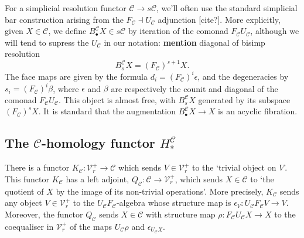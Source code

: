 \documentclass[11pt]{amsart}
\theoremstyle{plain}
\theoremstyle{definition}
\renewcommand{\to}{\longrightarrow}
\newcommand{\calC}{\mathcal{C}}
\newcommand{\calV}{\mathcal{V}}
\theoremstyle{plain}
\newcommand{\vect}[2]{\calV^{#1}_{#2}}
\begin{document}
\begin{Conventions and notation}
For a simplicial resolution functor $\calC\to s\calC$, we'll often use the standard simplicial bar construction arising from the $F_\calC\dashv U_\calC$ adjunction [cite?]. More explicitly, given $X\in\calC$, we define $B_\bullet^\calC X\in s\calC$ by iteration of the comonad $F_\calC U_\calC$, although we will tend to supress the $U_\calC$ in our notation: \textbf{mention} diagonal of bisimp resolution
\[B_s^\calC X=(F_\calC)^{s+1}X.\]
The face maps are given by the formula $d_i=(F_\calC)^i\epsilon$, and the degeneracies by $s_i=(F_\calC)^i\beta$, where $\epsilon$ and $\beta$ are respectively the counit and diagonal of the comonad $F_\calC U_\calC$. This object is almost free, with $B_s^\calC X$ generated by its subspace $(F_{\calC})^sX$. It is standard that the augmentation $B_\bullet^\calC X\to X$ is an acyclic fibration.


\subsection{The $\calC$-homology functor $H^{\calC}_*$}
There is a functor $K_\calC:\vect{+}{r}\to \calC$ which sends $V\in\vect{+}{r}$ to the `trivial object on $V$'. This functor $K_{\calC}$ has a left adjoint, $Q_{\calC}:\calC\to\vect{+}{r}$, which sends $X\in\calC$ to `the quotient of $X$ by the image of its non-trivial operations'. More precisely, $K_\calC$ sends any object $V\in\vect{+}{r}$ to the $U_{\calC}F_{\calC}$-algebra whose structure map is $\epsilon_V:U_{\calC}F_{\calC}V\to V$. Moreover, the functor $Q_{\calC}$ sends $X\in \calC$ with structure map $\rho:F_\calC U_\calC X\to X$ to the coequaliser in $\vect{+}{r}$ of the maps $U_\calC\rho$ and $\epsilon_{U_\calC X}$.


\end{Conventions and notation}
\end{document}
